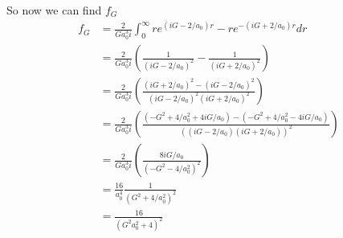 \documentclass[11pt]{article}
\numberwithin{equation}{section}
\begin{document}
So now we can find $f_G$
\begin{align*}
f_G &= \frac{2}{Ga_0^3i}\int_{0}^{\infty} re^{(iG-2/a_0)r}-re^{-(iG+2/a_0)r}dr\\
&= \frac{2}{Ga_0^3i}\left(\frac{1}{(iG-2/a_0)^2} - \frac{1}{(iG+2/a_0)^2}\right)\\
&= \frac{2}{Ga_0^3i}\left(\frac{(iG+2/a_0)^2 - (iG-2/a_0)^2}{(iG-2/a_0)^2(iG+2/a_0)^2}\right)\\
&= \frac{2}{Ga_0^3i}\left(\frac{(-G^2+4/a_0^2+4iG/a_0) - (-G^2 + 4/a_0^2 - 4iG/a_0)}{\left((iG-2/a_0)(iG+2/a_0)\right)^2}\right)\\
&= \frac{2}{Ga_0^3i}\left(\frac{8iG/a_0}{\left(-G^2-4/a_0^2\right)^2}\right)\\
&= \frac{16}{a_0^4}\frac{1}{\left(G^2+4/a_0^2\right)^2}\\
&= \frac{16}{\left(G^2a_0^2+4\right)^2}
\end{align*}
\end{document}
